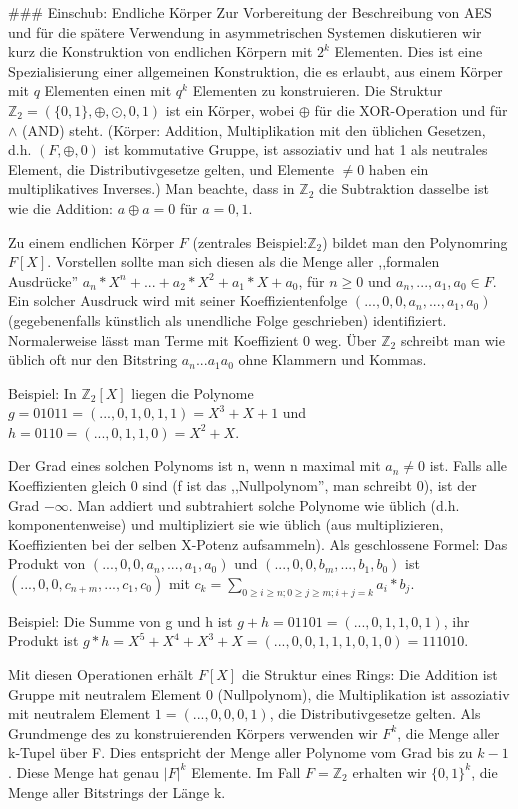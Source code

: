 \documentclass[a4paper]{article}
\begin{document}
\begin{multicols}{3}
    ### Einschub: Endliche Körper
    Zur Vorbereitung der Beschreibung von AES und für die spätere Verwendung in asymmetrischen Systemen diskutieren wir kurz die Konstruktion von endlichen Körpern mit $2^k$ Elementen. Dies ist eine Spezialisierung einer allgemeinen Konstruktion, die es erlaubt, aus einem Körper mit $q$ Elementen einen mit $q^k$ Elementen zu konstruieren.
    Die Struktur $\mathbb{Z}_2=(\{0,1\},\oplus,\odot, 0 ,1)$ ist ein Körper, wobei $\oplus$ für die XOR-Operation und für $\wedge$ (AND) steht. (Körper: Addition, Multiplikation mit den üblichen Gesetzen, d.h. $(F,\oplus ,0)$ ist kommutative Gruppe, ist assoziativ und hat 1 als neutrales Element, die Distributivgesetze gelten, und Elemente $\not=0$ haben ein multiplikatives Inverses.) Man beachte, dass in $\mathbb{Z}_2$ die Subtraktion dasselbe ist wie die Addition: $a\oplus a= 0$ für $a=0,1$.

    Zu einem endlichen Körper $F$ (zentrales Beispiel:$\mathbb{Z}_2$) bildet man den Polynomring $F[X]$. Vorstellen sollte man sich diesen als die Menge aller ,,formalen Ausdrücke'' $a_n* X^n+...+a_2 *X^2 +a_1 *X+a_0$, für $n\geq 0$ und $a_n,...,a_1,a_0\in F$. Ein solcher Ausdruck wird mit seiner Koeffizientenfolge $(...,0,0,a_n,...,a_1,a_0)$ (gegebenenfalls künstlich als unendliche Folge geschrieben) identifiziert. Normalerweise lässt man Terme mit Koeffizient 0 weg. Über $\mathbb{Z}_2$ schreibt man wie üblich oft nur den Bitstring $a_n...a_1a_0$ ohne Klammern und Kommas.

    Beispiel: In $\mathbb{Z}_2[X]$ liegen die Polynome $g=01011=(..., 0 , 1 , 0 , 1 ,1) =X^3 +X+1$ und $h=0110=(..., 0 , 1 , 1 ,0) =X^2 +X$.

    Der Grad eines solchen Polynoms ist n, wenn n maximal mit $a_n\not = 0$ ist. Falls alle Koeffizienten gleich 0 sind (f ist das ,,Nullpolynom'', man schreibt 0), ist der Grad $-\infty$. Man addiert und subtrahiert solche Polynome wie üblich (d.h. komponentenweise) und multipliziert sie wie üblich (aus multiplizieren, Koeffizienten bei der selben X-Potenz aufsammeln). Als geschlossene Formel: Das Produkt von $(...,0,0,a_n,...,a_1,a_0)$ und $(...,0,0,b_m,...,b_1,b_0)$ ist $(...,0,0,c_{n+m},...,c_1,c_0)$ mit $c_k=\sum_{0\geq i\geq n; 0\geq j\geq m; i+j=k} a_i*b_j$.

    Beispiel: Die Summe von g und h ist $g+h=01101=(...,0,1,1,0,1)$, ihr Produkt ist $g*h=X^5+X^4+X^3+X=(...,0,0,1,1,1,0,1,0)=111010$.

    Mit diesen Operationen erhält $F[X]$ die Struktur eines Rings: Die Addition ist Gruppe mit neutralem Element 0 (Nullpolynom), die Multiplikation ist assoziativ mit neutralem Element $1=(...,0,0,0,1)$, die Distributivgesetze gelten.
    Als Grundmenge des zu konstruierenden Körpers verwenden wir $F^k$, die Menge aller k-Tupel über F. Dies entspricht der Menge aller Polynome vom Grad bis zu $k-1$. Diese Menge hat genau $|F|^k$ Elemente. Im Fall $F=\mathbb{Z}_2$ erhalten wir $\{0,1\}^k$, die Menge aller Bitstrings der Länge k.


\end{multicols}
\end{document}
